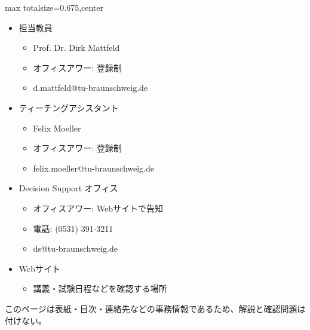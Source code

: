 \clearpage
{}
\begin{adjustbox}{max totalsize={\textwidth}{0.675\textheight},center}
\begin{minipage}{\textwidth}\scriptsize
\begin{minipage}[t]{0.485\textwidth}
\begin{itemize}
\item 担当教員
\begin{itemize}
\item Prof. Dr. Dirk Mattfeld
\item オフィスアワー: 登録制
\item d.mattfeld@tu-braunschweig.de
\end{itemize}
\item ティーチングアシスタント
\begin{itemize}
\item Felix Moeller
\item オフィスアワー: 登録制
\item felix.moeller@tu-braunschweig.de
\end{itemize}
\item Decision Support オフィス
\begin{itemize}
\item オフィスアワー: Webサイトで告知
\item 電話: (0531) 391-3211
\item ds@tu-braunschweig.de
\end{itemize}
\item Webサイト
\begin{itemize}
\item 講義・試験日程などを確認する場所
\end{itemize}
\end{itemize}
\end{minipage}\hfill
\begin{minipage}[t]{0.485\textwidth}
{\small このページは表紙・目次・連絡先などの事務情報であるため、解説と確認問題は付けない。}
\end{minipage}
\end{minipage}
\end{adjustbox}

